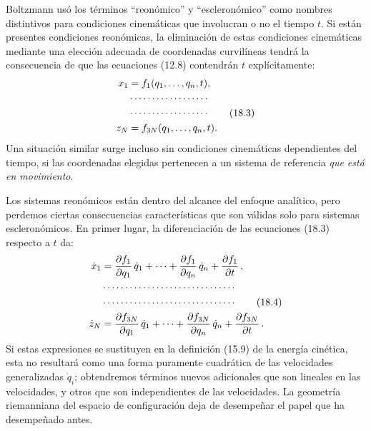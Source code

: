 \documentclass[12pt,a4paper]{book}
\begin{document}
\begin{center}
Boltzmann us\'o los t\'erminos ``reon\'omico'' y ``escleron\'omico'' como nombres distintivos para condiciones cinem\'aticas que involucran o no el tiempo $t$. Si est\'an presentes condiciones reon\'omicas, la eliminaci\'on de estas condiciones cinem\'aticas mediante una elecci\'on adecuada de coordenadas curvil\'ineas tendr\'a la consecuencia de que las ecuaciones (12.8) contendr\'an $t$ expl\'icitamente:
\begin{align}
x_1 &= f_1(q_1, \ldots, q_n, t), \notag\\
&\cdots\cdots\cdots\cdots\cdots\cdots \notag\\
&\cdots\cdots\cdots\cdots\cdots\cdots \tag{18.3}\\
z_N &= f_{3N}(q_1, \ldots, q_n, t). \notag
\end{align}
Una situaci\'on similar surge incluso sin condiciones cinem\'aticas dependientes del tiempo, si las coordenadas elegidas pertenecen a un sistema de referencia \textit{que est\'a en movimiento}.

Los sistemas reon\'omicos est\'an dentro del alcance del enfoque anal\'itico, pero perdemos ciertas consecuencias caracter\'isticas que son v\'alidas solo para sistemas escleron\'omicos. En primer lugar, la diferenciaci\'on de las ecuaciones (18.3) respecto a $t$ da:
\begin{align}
\dot{x}_1 &= \frac{\partial f_1}{\partial q_1}\,\dot{q}_1 + \cdots + \frac{\partial f_1}{\partial q_n}\,\dot{q}_n + \frac{\partial f_1}{\partial t}\,, \notag\\
&\cdots\cdots\cdots\cdots\cdots\cdots\cdots\cdots\cdots\cdots \notag\\
&\cdots\cdots\cdots\cdots\cdots\cdots\cdots\cdots\cdots\cdots \tag{18.4}\\
\dot{z}_N &= \frac{\partial f_{3N}}{\partial q_1}\,\dot{q}_1 + \cdots + \frac{\partial f_{3N}}{\partial q_n}\,\dot{q}_n + \frac{\partial f_{3N}}{\partial t}\,. \notag
\end{align}
Si estas expresiones se sustituyen en la definici\'on (15.9) de la energ\'ia cin\'etica, esta no resultar\'a como una forma puramente cuadr\'atica de las velocidades generalizadas $\dot{q}_i$; obtendremos t\'erminos nuevos adicionales que son lineales en las velocidades, y otros que son independientes de las velocidades. La geometr\'ia riemanniana del espacio de configuraci\'on deja de desempe\~nar el papel que ha desempe\~nado antes.


\end{center}
\end{document}
